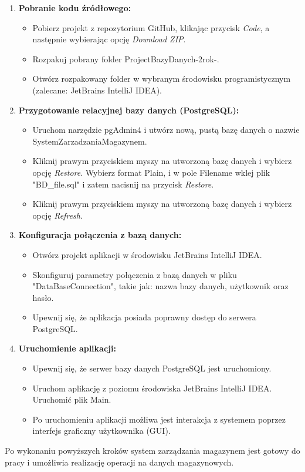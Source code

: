 \begin{enumerate}
    \item \textbf{Pobranie kodu źródłowego:}
    \begin{itemize}
        \item Pobierz projekt z repozytorium GitHub, klikając przycisk \textit{Code},
        a następnie wybierając opcję \textit{Download ZIP}.
        \item Rozpakuj pobrany folder ProjectBazyDanych-2rok-.
        \item Otwórz rozpakowany folder w wybranym środowisku programistycznym
        (zalecane: JetBrains IntelliJ IDEA).
    \end{itemize}

    \item \textbf{Przygotowanie relacyjnej bazy danych (PostgreSQL):}
    \begin{itemize}
        \item Uruchom narzędzie pgAdmin4 i utwórz nową, pustą bazę danych o nazwie SystemZarzadzaniaMagazynem.
        \item Kliknij prawym przyciskiem myszy na utworzoną bazę danych i wybierz
        opcję \textit{Restore}. Wybierz format Plain, i w pole Filename wklej plik "BD\_file.sql" i zatem nacisnij na przycisk \textit{Restore}.
        \item Kliknij prawym przyciskiem myszy na utworzoną bazę danych i wybierz
        opcję \textit{Refresh}.
    \end{itemize}

    \item \textbf{Konfiguracja połączenia z bazą danych:}
    \begin{itemize}
        \item Otwórz projekt aplikacji w środowisku JetBrains IntelliJ IDEA.
        \item Skonfiguruj parametry połączenia z bazą danych w pliku "DataBaseConnection", takie jak:
        nazwa bazy danych, użytkownik oraz hasło.
        \item Upewnij się, że aplikacja posiada poprawny dostęp do serwera
        PostgreSQL.
    \end{itemize}

    \item \textbf{Uruchomienie aplikacji:}
    \begin{itemize}
        \item Upewnij się, że serwer bazy danych PostgreSQL jest uruchomiony.
        \item Uruchom aplikację z poziomu środowiska JetBrains IntelliJ IDEA. Uruchomić plik Main.
        \item Po uruchomieniu aplikacji możliwa jest interakcja z systemem
        poprzez interfejs graficzny użytkownika (GUI).
    \end{itemize}
\end{enumerate}

Po wykonaniu powyższych kroków system zarządzania magazynem jest gotowy
do pracy i umożliwia realizację operacji na danych magazynowych.
